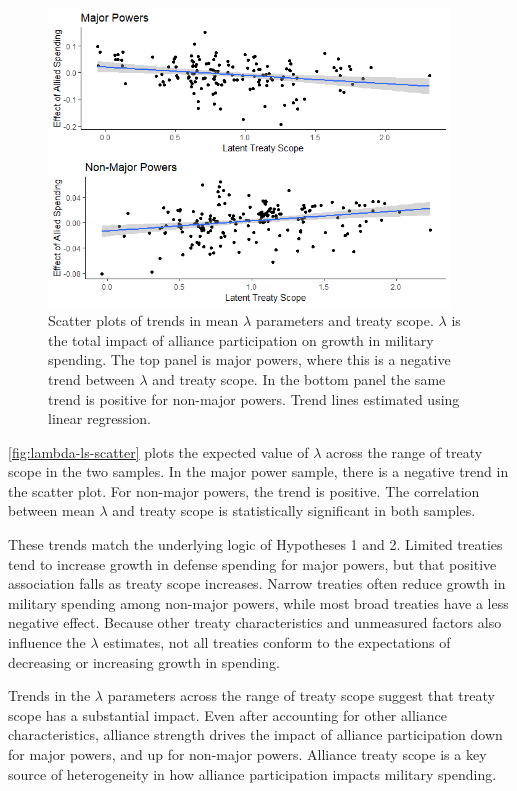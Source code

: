 \documentclass[12pt]{article}
\begin{document}
\begin{figure}[htbp]
	\centering
		\includegraphics[width=0.95\textwidth]{../figures/lambda-ls-scatter.png}
	\caption{Scatter plots of trends in mean $\lambda$ parameters and treaty scope. $\lambda$ is the total impact of alliance participation on growth in military spending. The top panel is major powers, where this is a negative trend between $\lambda$ and treaty scope. In the bottom panel the same trend is positive for non-major powers. Trend lines estimated using linear regression.}
	\label{fig:lambda-ls-scatter}
\end{figure}


\autoref{fig:lambda-ls-scatter} plots the expected value of $\lambda$ across the range of treaty scope in the two samples. 
In the major power sample, there is a negative trend in the scatter plot.
For non-major powers, the trend is positive.
The correlation between mean $\lambda$ and treaty scope is statistically significant in both samples. 


These trends match the underlying logic of Hypotheses 1 and 2. 
Limited treaties tend to increase growth in defense spending for major powers, but that positive association falls as treaty scope increases. 
Narrow treaties often reduce growth in military spending among non-major powers, while most broad treaties have a less negative effect. 
Because other treaty characteristics and unmeasured factors also influence the $\lambda$ estimates, not all treaties conform to the expectations of decreasing or increasing growth in spending. 


Trends in the $\lambda$ parameters across the range of treaty scope suggest that treaty scope has a substantial impact. 
Even after accounting for other alliance characteristics, alliance strength drives the impact of alliance participation down for major powers, and up for non-major powers. 
Alliance treaty scope is a key source of heterogeneity in how alliance participation impacts military spending. 
\end{document}
